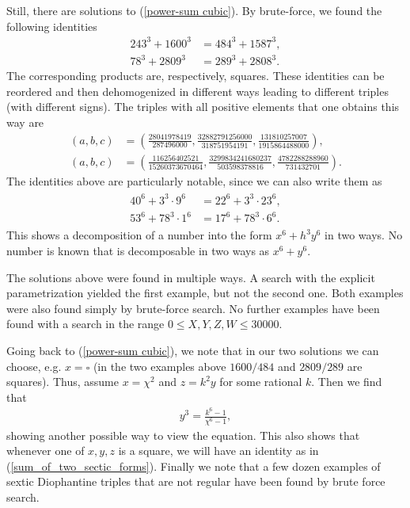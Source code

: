 \documentclass{amsart}
\begin{document}
Still, there are solutions to (\ref{power-sum cubic}). By brute-force, we found the following identities
\begin{align*}
    243^3+1600^3 &= 484^3+1587^3, \\
    78^3 + 2809^3 &= 289^3 + 2808^3.
\end{align*}
The corresponding products are, respectively, squares. These identities can be reordered and then dehomogenized in different ways leading to different triples (with different signs). The triples with all positive elements that one obtains this way are
\begin{align*}
(a,b,c) &= \left(
\frac{28041978419}{287496000}, 
\frac{32882791256000}{318751954191},
\frac{131810257007}{1915864488000}
\right),\\
    (a,b,c) &= \left(
\frac{116256402521}{15260373670464},
\frac{3299834241680237}{503598378816},
\frac{4782288288960}{731432701}
\right).
\end{align*}
The identities above are particularly notable, since we can also write them as
\begin{align} \label{sum_of_two_sectic_forms}
\begin{split}
    40^6 + 3^3\cdot 9^6 &= 22^6+3^3\cdot 23^6, \\
    53^6 + 78^3\cdot 1^6 &= 17^6 + 78^3\cdot 6^6.
\end{split}
\end{align}
This shows a decomposition of a number into the form $x^6+h^3y^6$ in two ways. No number is known that is decomposable in two ways as $x^6+y^6$.

The solutions above were found in multiple ways. A search with the explicit parametrization yielded the first example, but not the second one. Both examples were also found simply by brute-force search. No further examples have been found with a search in the range $0 \leq X,Y,Z,W \leq 30000$.

Going back to (\ref{power-sum cubic}), we note that in our two solutions we can choose, e.g. $x=\square$ (in the two examples above $1600/484$ and $2809/289$ are squares). Thus, assume $x=\chi^2$ and $z=k^2y$ for some rational $k$. Then we find that
\begin{align*}
    y^3 = \frac{k^6-1}{\chi^6-1},
\end{align*}
showing another possible way to view the equation. This also shows that whenever one of $x,y,z$ is a square, we will have an identity as in (\ref{sum_of_two_sectic_forms}).
Finally we note that a few dozen examples of sextic Diophantine triples that are not regular have been found by brute force search.
\end{document}
